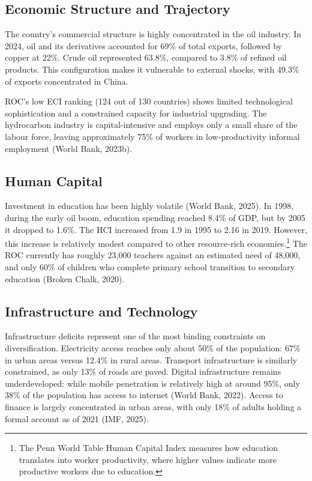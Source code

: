 \documentclass[12pt,a4paper]{report}
\begin{document}
\subsection{Economic Structure and Trajectory}

The country's commercial structure is highly concentrated in the oil industry. In 2024, oil and its derivatives accounted for 69\% of total exports, followed by copper at 22\%. Crude oil represented 63.8\%, compared to 3.8\% of refined oil products. This configuration makes it vulnerable to external shocks, with 49.3\% of exports concentrated in China.

ROC's low ECI ranking (124 out of 130 countries) shows limited technological sophistication and a constrained capacity for industrial upgrading. The hydrocarbon industry is capital-intensive and employs only a small share of the labour force, leaving approximately 75\% of workers in low-productivity informal employment (World Bank, 2023b).

\subsection{Human Capital}

Investment in education has been highly volatile (World Bank, 2025). In 1998, during the early oil boom, education spending reached 8.4\% of GDP, but by 2005 it dropped to 1.6\%. The HCI increased from 1.9 in 1995 to 2.16 in 2019. However, this increase is relatively modest compared to other resource-rich economies.\footnote{The Penn World Table Human Capital Index measures how education translates into worker productivity, where higher values indicate more productive workers due to education.} The ROC currently has roughly 23,000 teachers against an estimated need of 48,000, and only 60\% of children who complete primary school transition to secondary education (Broken Chalk, 2020).

\subsection{Infrastructure and Technology}

Infrastructure deficits represent one of the most binding constraints on diversification. Electricity access reaches only about 50\% of the population: 67\% in urban areas versus 12.4\% in rural areas. Transport infrastructure is similarly constrained, as only 13\% of roads are paved. Digital infrastructure remains underdeveloped: while mobile penetration is relatively high at around 95\%, only 38\% of the population has access to internet (World Bank, 2022). Access to finance is largely concentrated in urban areas, with only 18\% of adults holding a formal account as of 2021 (IMF, 2025).
\end{document}
